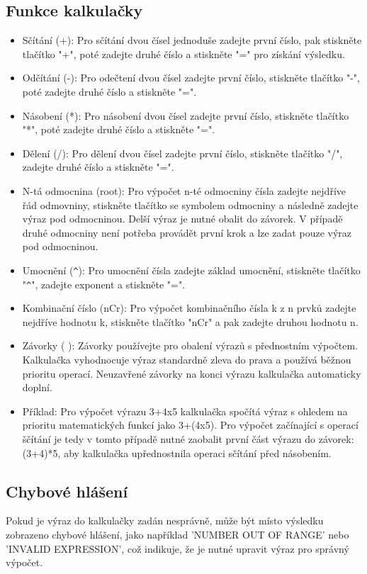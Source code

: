 \documentclass[a4paper, 11pt]{article}
\begin{document}
    \subsection*{Funkce kalkulačky}
    \begin{itemize}
        \item Sčítání (+): Pro sčítání dvou čísel jednoduše zadejte první číslo, pak stiskněte tlačítko "+", poté zadejte druhé číslo a stiskněte "=" pro získání výsledku.
        \item Odčítání (-): Pro odečtení dvou čísel zadejte první číslo, stiskněte tlačítko "-", poté zadejte druhé číslo a stiskněte "=".
        \item Násobení (*): Pro násobení dvou čísel zadejte první číslo, stiskněte tlačítko "*", poté zadejte druhé číslo a stiskněte "=".
        \item Dělení (/): Pro dělení dvou čísel zadejte první číslo, stiskněte tlačítko "/", zadejte druhé číslo a stiskněte "=".
        \item N-tá odmocnina (root): Pro výpočet n-té odmocniny čísla zadejte nejdříve řád odmovniny, stiskněte tlačítko se symbolem odmocniny a následně zadejte výraz pod odmocninou. Delší výraz je nutné obalit do závorek. V případě druhé odmocniny není potřeba provádět první krok a lze zadat pouze výraz pod odmocninou.
        \item Umocnění (\verb|^|): Pro umocnění čísla zadejte základ umocnění, stiskněte tlačítko "\verb|^|", zadejte exponent a stiskněte "=".
        \item Kombinační číslo (nCr): Pro výpočet kombinačního čísla k z n prvků zadejte nejdříve hodnotu k, stiskněte tlačítko "nCr" a pak zadejte druhou hodnotu n.
        \item Závorky ( ): Závorky používejte pro obalení výrazů s přednostním výpočtem. Kalkulačka vyhodnocuje výraz standardně zleva do prava a používá běžnou prioritu operací. Neuzavřené závorky na konci výrazu kalkulačka automaticky doplní.
        \item Příklad: Pro výpočet výrazu 3+4x5 kalkulačka spočítá výraz s ohledem na prioritu matematických funkcí jako 3+(4x5). Pro výpočet začínající s operací ščítání je tedy v tomto případě nutné zaobalit první část výrazu do závorek: (3+4)*5, aby kalkulačka upřednostnila operaci sčítání před násobením.
    \end{itemize}
    \subsection*{Chybové hlášení}
     Pokud je výraz do kalkulačky zadán nesprávně, může být místo výsledku zobrazeno chybové hlášení, jako například 'NUMBER OUT OF RANGE' nebo 'INVALID EXPRESSION', což indikuje, že je nutné upravit výraz pro správný výpočet. 
\end{document}
